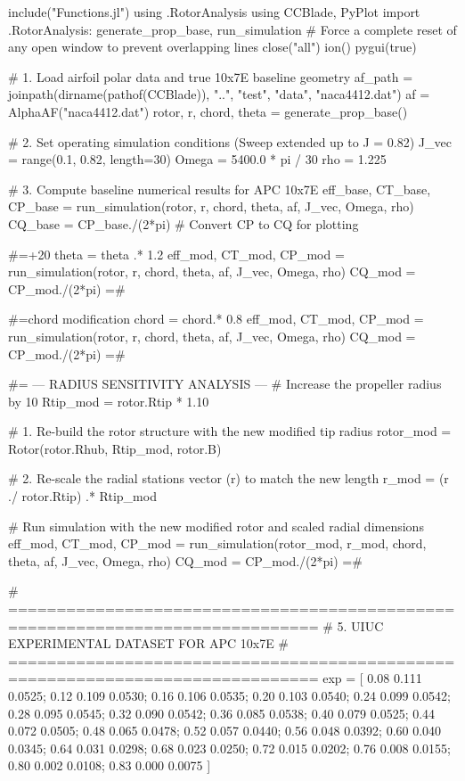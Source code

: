 include("Functions.jl")
using .RotorAnalysis
using CCBlade, PyPlot
import .RotorAnalysis: generate_prop_base, run_simulation
# Force a complete reset of any open window to prevent overlapping lines
close("all")
ion()
pygui(true)

# 1. Load airfoil polar data and true 10x7E baseline geometry
af_path = joinpath(dirname(pathof(CCBlade)), "..", "test", "data", "naca4412.dat")
af = AlphaAF("naca4412.dat")
rotor, r, chord, theta = generate_prop_base()

# 2. Set operating simulation conditions (Sweep extended up to J = 0.82)
J_vec = range(0.1, 0.82, length=30) 
Omega = 5400.0 * pi / 30
rho = 1.225

# 3. Compute baseline numerical results for APC 10x7E
eff_base, CT_base, CP_base = run_simulation(rotor, r, chord, theta, af, J_vec, Omega, rho)
CQ_base = CP_base./(2*pi) # Convert CP to CQ for plotting

#=+20%
theta = theta .* 1.2
eff_mod, CT_mod, CP_mod = run_simulation(rotor, r, chord, theta, af, J_vec, Omega, rho)
CQ_mod = CP_mod./(2*pi) =#

#=chord modification
chord = chord.* 0.8
eff_mod, CT_mod, CP_mod = run_simulation(rotor, r, chord, theta, af, J_vec, Omega, rho)
CQ_mod = CP_mod./(2*pi) =#


#= --- RADIUS SENSITIVITY ANALYSIS ---
# Increase the propeller radius by 10%
Rtip_mod = rotor.Rtip * 1.10

# 1. Re-build the rotor structure with the new modified tip radius
rotor_mod = Rotor(rotor.Rhub, Rtip_mod, rotor.B)

# 2. Re-scale the radial stations vector (r) to match the new length
r_mod = (r ./ rotor.Rtip) .* Rtip_mod

# Run simulation with the new modified rotor and scaled radial dimensions
eff_mod, CT_mod, CP_mod = run_simulation(rotor_mod, r_mod, chord, theta, af, J_vec, Omega, rho)
CQ_mod = CP_mod./(2*pi)
=#



# ==============================================================================
# 5. UIUC EXPERIMENTAL DATASET FOR APC 10x7E
# ==============================================================================
exp = [
    0.08  0.111  0.0525;
    0.12  0.109  0.0530;
    0.16  0.106  0.0535;
    0.20  0.103  0.0540;
    0.24  0.099  0.0542;
    0.28  0.095  0.0545;
    0.32  0.090  0.0542;
    0.36  0.085  0.0538;
    0.40  0.079  0.0525;
    0.44  0.072  0.0505;
    0.48  0.065  0.0478;
    0.52  0.057  0.0440;
    0.56  0.048  0.0392;
    0.60  0.040  0.0345;
    0.64  0.031  0.0298;
    0.68  0.023  0.0250;
    0.72  0.015  0.0202;
    0.76  0.008  0.0155;
    0.80  0.002  0.0108;
    0.83  0.000  0.0075
]

